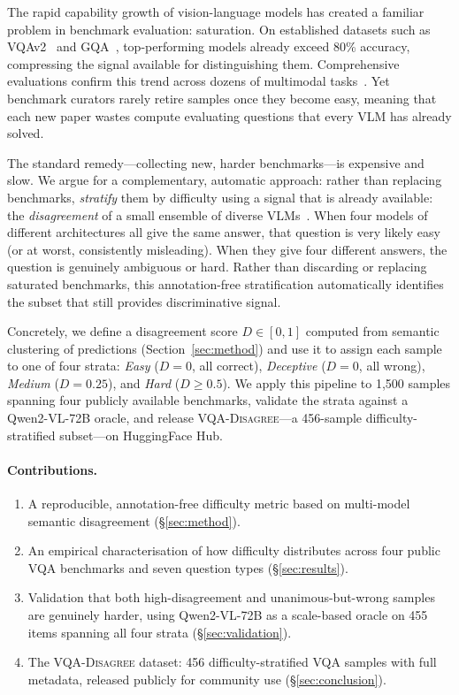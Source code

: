\documentclass[10pt,twocolumn,letterpaper]{article}
\newcommand{\dname}{\textsc{VQA-Disagree}}
\begin{document}
The rapid capability growth of vision-language models has created a
familiar problem in benchmark evaluation: saturation.  On established
datasets such as VQAv2~\cite{goyal2017vqav2} and
GQA~\cite{hudson2019gqa}, top-performing models already exceed 80\%
accuracy, compressing the signal available for distinguishing them.
Comprehensive evaluations confirm this trend across dozens of multimodal
tasks~\cite{fu2024mmbench}.  Yet benchmark curators rarely retire samples
once they become easy, meaning that each new paper wastes compute
evaluating questions that every VLM has already solved.

The standard remedy---collecting new, harder benchmarks---is expensive and
slow.  We argue for a complementary, automatic approach: rather than
replacing benchmarks, \emph{stratify} them by difficulty using a signal
that is already available: the \emph{disagreement} of a small ensemble of
diverse VLMs~\cite{swayamdipta2020cartography}.  When four models of
different architectures all give the same answer, that question is very
likely easy (or at worst, consistently misleading).  When they give four
different answers, the question is genuinely ambiguous or hard.  Rather
than discarding or replacing saturated benchmarks, this annotation-free
stratification automatically identifies the subset that still provides
discriminative signal.

Concretely, we define a disagreement score $D \in [0, 1]$ computed from
semantic clustering of predictions (Section~\ref{sec:method}) and use it
to assign each sample to one of four strata: \emph{Easy} ($D=0$, all
correct), \emph{Deceptive} ($D=0$, all wrong), \emph{Medium}
($D=0.25$), and \emph{Hard} ($D \geq 0.5$).  We apply this pipeline
to 1,500 samples spanning four publicly available benchmarks, validate the
strata against a Qwen2-VL-72B oracle, and release \dname{}---a 456-sample
difficulty-stratified subset---on HuggingFace Hub.

\paragraph{Contributions.}
\begin{enumerate}[leftmargin=*,topsep=2pt,itemsep=1pt]
\item A reproducible, annotation-free difficulty metric based on
  multi-model semantic disagreement (\S\ref{sec:method}).
\item An empirical characterisation of how difficulty distributes across
  four public VQA benchmarks and seven question types (\S\ref{sec:results}).
\item Validation that both high-disagreement and unanimous-but-wrong
  samples are genuinely harder, using Qwen2-VL-72B as a scale-based oracle
  on 455 items spanning all four strata (\S\ref{sec:validation}).
\item The \dname{} dataset: 456 difficulty-stratified VQA samples with
  full metadata, released publicly for community use (\S\ref{sec:conclusion}).
\end{enumerate}
\end{document}
